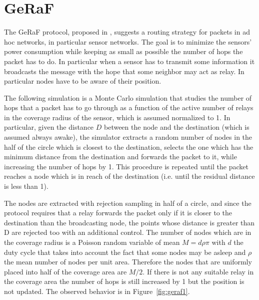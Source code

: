 \documentclass[10pt]{article}
\begin{document}
\FloatBarrier

\section*{GeRaF}
The GeRaF protocol, proposed in \cite{tmc}, suggests a routing strategy for packets in ad hoc networks, in particular sensor networks. The goal is to minimize the sensors' power consumption while keeping as small as possible the number of hops the packet has to do. In particular when a sensor has to transmit some information it broadcasts the message with the hope that some neighbor may act as relay. In particular nodes have to be aware of their position. 

The following simulation is a Monte Carlo simulation that studies the number of hops that a packet has to go through as a function of the active number of relays in the coverage radius of the sensor, which is assumed normalized to 1. In particular, given the distance $D$ between the node and the destination (which is assumed always awake), the simulator extracts a random number of nodes in the half of the circle which is closest to the destination, selects the one which has the minimum distance from the destination and forwards the packet to it, while increasing the number of hops by 1. This procedure is repeated until the packet reaches a node which is in reach of the destination (i.e. until the residual distance is less than 1). 

The nodes are extracted with rejection sampling in half of a circle, and since the protocol requires that a relay forwards the packet only if it is closer to the destination than the broadcasting node, the points whose distance is greater than D are rejected too with an additional control. The number of nodes which are in the coverage radius is a Poisson random variable of mean $M = d \rho \pi$ with $d$ the duty cycle that takes into account the fact that some nodes may be asleep and $\rho$ the mean number of nodes per unit area. Therefore the nodes that are uniformly placed into half of the coverage area are $M/2$. If there is not any suitable relay in the coverage area the number of hops is still increased by 1 but the position is not updated. The observed behavior is in Figure~\ref{fig:geraf1}.
\end{document}
